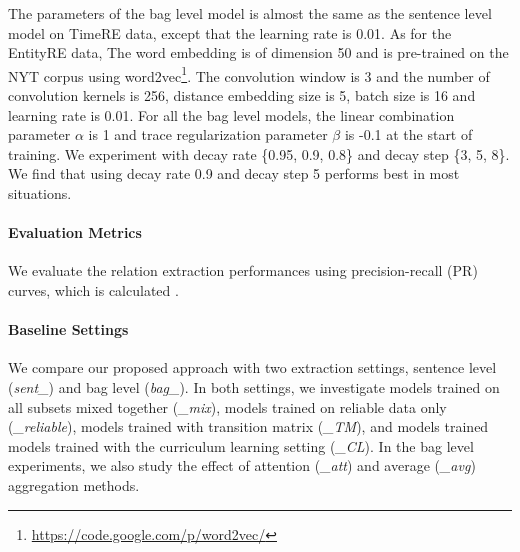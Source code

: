 The parameters of the bag level model is almost the same as the sentence level model on TimeRE data, except that the learning rate is 0.01. As for the EntityRE data, The word embedding is of dimension 50 and is pre-trained on the NYT corpus using word2vec\footnote{\url{ https://code.google.com/p/word2vec/}}. The convolution window is 3 and the number of convolution kernels is 256, distance embedding size is 5, batch size is 16 and learning rate is 0.01. For all the bag level models, the linear combination parameter $\alpha$ is 1 and trace regularization parameter $\beta$ is -0.1 at the start of training. We experiment with decay rate \{0.95, 0.9, 0.8\} and decay step \{3, 5, 8\}. We find that using decay rate 0.9 and decay step 5 performs best in most situations.

\paragraph{Evaluation Metrics}
We evaluate the relation extraction performances using precision-recall (PR) curves, which is calculated .

\paragraph{Baseline Settings}
We compare our proposed approach with two extraction settings, sentence level (\emph{sent\_}) and bag level (\emph{bag\_}). In both settings, we investigate models trained on all subsets mixed together (\emph{\_mix}), models trained on reliable data only (\emph{\_reliable}), models trained with transition matrix (\emph{\_TM}), and models trained models trained with the curriculum learning setting  (\emph{\_CL}). In the bag level experiments, we also study the effect of attention (\emph{\_att}) and average (\emph{\_avg}) aggregation methods.

